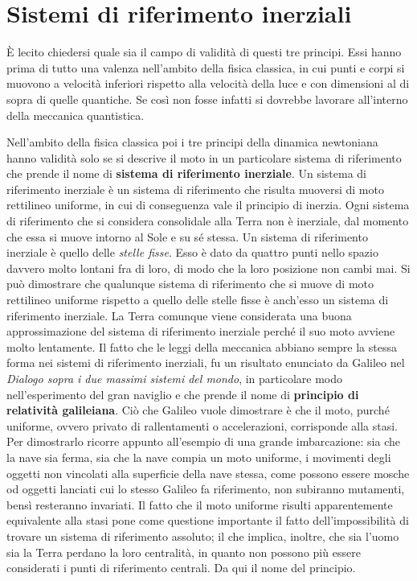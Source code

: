 \documentclass[10pt,a4paper]{book}
\begin{document}
\section{Sistemi di riferimento inerziali}

È lecito chiedersi quale sia il campo di validità di questi tre principi. Essi hanno prima di tutto una valenza nell'ambito della fisica classica, in cui punti e corpi si muovono a velocità inferiori rispetto alla velocità della luce e con dimensioni al di sopra di quelle quantiche. Se così non fosse infatti si dovrebbe lavorare all'interno della meccanica quantistica.

Nell'ambito della fisica classica poi i tre principi della dinamica newtoniana hanno validità solo se si descrive il moto in un particolare sistema di riferimento che prende il nome di \textbf{sistema di riferimento inerziale}.
Un sistema di riferimento inerziale è un sistema di riferimento che risulta muoversi di moto rettilineo uniforme, in cui di conseguenza vale il principio di inerzia.
Ogni sistema di riferimento che si considera consolidale alla Terra non è inerziale, dal momento che essa si muove intorno al Sole e su sé stessa. Un sistema di riferimento inerziale è quello delle \emph{stelle fisse}. Esso è dato da quattro punti nello spazio davvero molto lontani fra di loro, di modo che la loro posizione non cambi mai. Si può dimostrare che qualunque sistema di riferimento che si muove di moto rettilineo uniforme rispetto a quello delle stelle fisse è anch'esso un sistema di riferimento inerziale.
La Terra comunque viene considerata una buona approssimazione del sistema di riferimento inerziale perché il suo moto avviene molto lentamente.
Il fatto che le leggi della meccanica abbiano sempre la stessa forma nei sistemi di riferimento inerziali, fu un risultato enunciato da Galileo nel \textit{Dialogo sopra i due massimi sistemi del mondo}, in particolare modo nell'esperimento del gran naviglio e che prende il nome di \textbf{principio di relatività galileiana}. Ciò che Galileo vuole dimostrare è che il moto, purché uniforme, ovvero privato di rallentamenti o accelerazioni, corrisponde alla stasi. Per dimostrarlo ricorre appunto all'esempio di una grande imbarcazione: sia che la nave sia ferma, sia che la nave compia un moto uniforme, i movimenti degli oggetti non vincolati alla superficie della nave stessa, come possono essere mosche od oggetti lanciati cui lo stesso Galileo fa riferimento, non subiranno mutamenti, bensì resteranno invariati.
Il fatto che il moto uniforme risulti apparentemente equivalente alla stasi pone come questione importante il fatto dell'impossibilità di trovare un sistema di riferimento assoluto; il che implica, inoltre, che sia l'uomo sia la Terra perdano la loro centralità, in quanto non possono più essere considerati i punti di riferimento centrali. Da qui il nome del principio.
\end{document}
